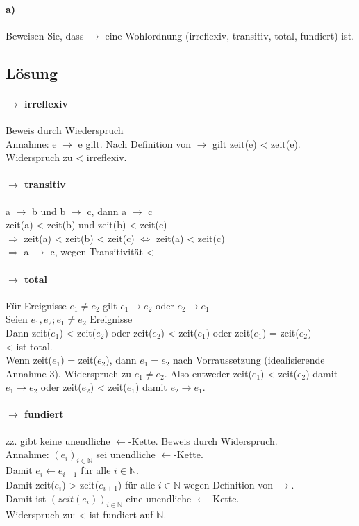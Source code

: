 \documentclass[a4paper]{scrartcl}
\begin{document}
\paragraph{a)} Beweisen Sie, dass \glqq $\rightarrow$\grqq{} eine Wohlordnung (irreflexiv, transitiv, total, fundiert) ist.

\subsection{Lösung}
\paragraph{$\rightarrow$ irreflexiv} Beweis durch Wiederspruch\\
Annahme: e $\rightarrow$ e gilt. Nach Definition von \glqq $\rightarrow$\grqq{} gilt zeit(e) < zeit(e).\\ Widerspruch zu < irreflexiv. 

\paragraph{$\rightarrow$ transitiv}
a $\rightarrow$ b und b $\rightarrow$ c, dann a $\rightarrow$ c\\
zeit(a) < zeit(b) und zeit(b) < zeit(c)\\
$\Rightarrow$ zeit(a) < zeit(b) < zeit(c) $\iff$ zeit(a) < zeit(c)\\ 
$\Rightarrow$ a $\rightarrow$ c, wegen Transitivität <

\paragraph{$\rightarrow$ total}
Für Ereignisse $e_1 \neq e_2$ gilt $e_1 \rightarrow e_2$ oder $e_2 \rightarrow e_1$ \\
Seien $e_1, e_2; e_1 \neq e_2$ Ereignisse\\
Dann zeit($e_1$) < zeit($e_2$) oder zeit($e_2$) < zeit($e_1$) oder zeit($e_1$) = zeit($e_2$)\\
\glqq <\grqq{} ist total.\\
Wenn zeit($e_1$) = zeit($e_2$), dann $e_1 = e_2$ nach Vorraussetzung (idealisierende Annahme 3). Widerspruch zu $e_1 \neq e_2$. Also entweder zeit($e_1$) < zeit($e_2$) damit $e_1 \rightarrow e_2$ oder zeit($e_2$) < zeit($e_1$) damit $e_2 \rightarrow e_1$.

\paragraph{$\rightarrow$ fundiert}
zz. gibt keine unendliche \glqq $\leftarrow$\grqq-Kette. Beweis durch Widerspruch.\\
Annahme: $\left(e_i\right)_{i \in \mathbb{N}}$ sei unendliche \glqq $\leftarrow$\grqq-Kette. \\
Damit $e_i \leftarrow e_{i + 1}$ für alle $i \in \mathbb{N}$. \\
Damit zeit($e_i$) > zeit($e_{i + 1}$) für alle $i \in \mathbb{N}$ wegen Definition von $\rightarrow$. \\
Damit ist $\left(zeit\left(e_i\right)\right)_{i \in \mathbb{N}}$ eine unendliche  \glqq $\leftarrow$\grqq-Kette. \\
Widerspruch zu: < ist fundiert auf $\mathbb{N}$.
\end{document}
